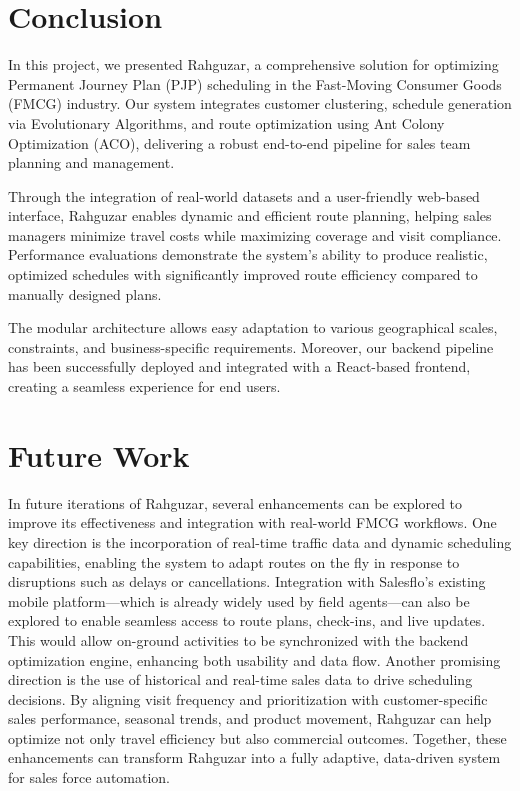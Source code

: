 \section{Conclusion}
In this project, we presented Rahguzar, a comprehensive solution for optimizing Permanent Journey Plan (PJP) scheduling in the Fast-Moving Consumer Goods (FMCG) industry. Our system integrates customer clustering, schedule generation via Evolutionary Algorithms, and route optimization using Ant Colony Optimization (ACO), delivering a robust end-to-end pipeline for sales team planning and management.

Through the integration of real-world datasets and a user-friendly web-based interface, Rahguzar enables dynamic and efficient route planning, helping sales managers minimize travel costs while maximizing coverage and visit compliance. Performance evaluations demonstrate the system’s ability to produce realistic, optimized schedules with significantly improved route efficiency compared to manually designed plans.

The modular architecture allows easy adaptation to various geographical scales, constraints, and business-specific requirements. Moreover, our backend pipeline has been successfully deployed and integrated with a React-based frontend, creating a seamless experience for end users.
\section{Future Work}
In future iterations of Rahguzar, several enhancements can be explored to improve its effectiveness and integration with real-world FMCG workflows. One key direction is the incorporation of real-time traffic data and dynamic scheduling capabilities, enabling the system to adapt routes on the fly in response to disruptions such as delays or cancellations. Integration with Salesflo’s existing mobile platform—which is already widely used by field agents—can also be explored to enable seamless access to route plans, check-ins, and live updates. This would allow on-ground activities to be synchronized with the backend optimization engine, enhancing both usability and data flow. Another promising direction is the use of historical and real-time sales data to drive scheduling decisions. By aligning visit frequency and prioritization with customer-specific sales performance, seasonal trends, and product movement, Rahguzar can help optimize not only travel efficiency but also commercial outcomes. Together, these enhancements can transform Rahguzar into a fully adaptive, data-driven system for sales force automation.